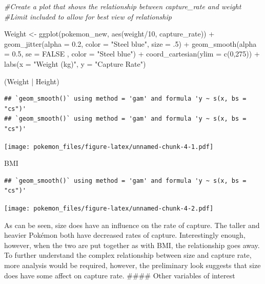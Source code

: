 \documentclass[
]{article}
\newenvironment{Shaded}{\begin{snugshade}}{\end{snugshade}}
\newcommand{\AttributeTok}[1]{\textcolor[rgb]{0.77,0.63,0.00}{#1}}
\newcommand{\CommentTok}[1]{\textcolor[rgb]{0.56,0.35,0.01}{\textit{#1}}}
\newcommand{\ConstantTok}[1]{\textcolor[rgb]{0.00,0.00,0.00}{#1}}
\newcommand{\DecValTok}[1]{\textcolor[rgb]{0.00,0.00,0.81}{#1}}
\newcommand{\FloatTok}[1]{\textcolor[rgb]{0.00,0.00,0.81}{#1}}
\newcommand{\FunctionTok}[1]{\textcolor[rgb]{0.00,0.00,0.00}{#1}}
\newcommand{\NormalTok}[1]{#1}
\newcommand{\OtherTok}[1]{\textcolor[rgb]{0.56,0.35,0.01}{#1}}
\newcommand{\SpecialCharTok}[1]{\textcolor[rgb]{0.00,0.00,0.00}{#1}}
\newcommand{\StringTok}[1]{\textcolor[rgb]{0.31,0.60,0.02}{#1}}
\begin{document}
\begin{Shaded}
\begin{Highlighting}[]
\CommentTok{\#Create a plot that shows the relationship between capture\_rate and weight}
\CommentTok{\#Limit included to allow for best view of relationship}

\NormalTok{Weight }\OtherTok{\textless{}{-}} \FunctionTok{ggplot}\NormalTok{(pokemon\_new, }\FunctionTok{aes}\NormalTok{(weight}\SpecialCharTok{/}\DecValTok{10}\NormalTok{, capture\_rate)) }\SpecialCharTok{+} 
  \FunctionTok{geom\_jitter}\NormalTok{(}\AttributeTok{alpha =} \FloatTok{0.2}\NormalTok{, }\AttributeTok{color =} \StringTok{"Steel blue"}\NormalTok{, }\AttributeTok{size =}\NormalTok{ .}\DecValTok{5}\NormalTok{) }\SpecialCharTok{+}
  \FunctionTok{geom\_smooth}\NormalTok{(}\AttributeTok{alpha =} \FloatTok{0.5}\NormalTok{, }\AttributeTok{se =} \ConstantTok{FALSE}\NormalTok{ , }\AttributeTok{color =} \StringTok{"Steel blue"}\NormalTok{) }\SpecialCharTok{+}
  \FunctionTok{coord\_cartesian}\NormalTok{(}\AttributeTok{ylim =} \FunctionTok{c}\NormalTok{(}\DecValTok{0}\NormalTok{,}\DecValTok{275}\NormalTok{)) }\SpecialCharTok{+}
  \FunctionTok{labs}\NormalTok{(}\AttributeTok{x =} \StringTok{"Weight (kg)"}\NormalTok{, }\AttributeTok{y =} \StringTok{"Capture Rate"}\NormalTok{)}


\NormalTok{(Weight }\SpecialCharTok{|}\NormalTok{ Height)}
\end{Highlighting}
\end{Shaded}

\begin{verbatim}
## `geom_smooth()` using method = 'gam' and formula 'y ~ s(x, bs = "cs")'
## `geom_smooth()` using method = 'gam' and formula 'y ~ s(x, bs = "cs")'
\end{verbatim}

\texttt{[image: pokemon\_files/figure-latex/unnamed-chunk-4-1.pdf]}

\begin{Shaded}
\begin{Highlighting}[]
\NormalTok{BMI}
\end{Highlighting}
\end{Shaded}

\begin{verbatim}
## `geom_smooth()` using method = 'gam' and formula 'y ~ s(x, bs = "cs")'
\end{verbatim}

\texttt{[image: pokemon\_files/figure-latex/unnamed-chunk-4-2.pdf]}

As can be seen, size does have an influence on the rate of capture. The
taller and heavier Pokémon both have decreased rates of capture.
Interestingly enough, however, when the two are put together as with
BMI, the relationship goes away. To further understand the complex
relationship between size and capture rate, more analysis would be
required, however, the preliminary look suggests that size does have
some affect on capture rate. \#\#\#\# Other variables of interest
\end{document}
